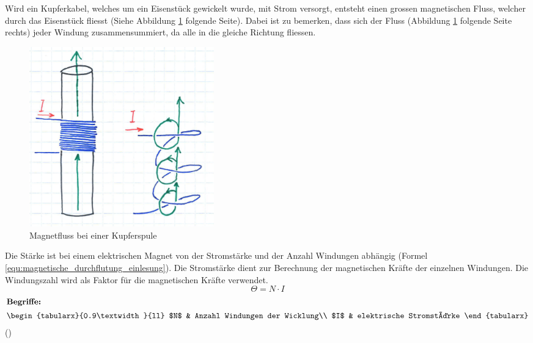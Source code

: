 \newpara
Wird ein Kupferkabel, welches um ein Eisenstück gewickelt wurde, mit Strom versorgt, entsteht einen grossen magnetischen Fluss, welcher durch das Eisenstück fliesst (Siehe Abbildung \ref{fig:kupferspule} folgende Seite). Dabei ist zu bemerken, dass sich der Fluss (Abbildung \ref{fig:kupferspule} folgende Seite rechts) jeder Windung zusammensummiert, da alle in die gleiche Richtung fliessen.
\begin{figure}[ht]
    \begin{center}
      \includegraphics[width=8cm]{assets/images/magnetismus/flussrichtung}
    \end{center}
    \vspace{-3ex}
    \caption{Magnetfluss bei einer Kupferspule}
    \label{fig:kupferspule}
\end{figure}
\newpara
Die Stärke ist bei einem elektrischen Magnet von der Stromstärke und der Anzahl Windungen abhängig (Formel \ref{equ:magnetische_durchflutung_einlesung}). Die Stromstärke dient zur Berechnung der magnetischen Kräfte der einzelnen Windungen. Die Windungszahl wird als Faktor für die magnetischen Kräfte verwendet.
\newpage
\begin{equation}
\label{equ:magnetische_durchflutung_einlesung}
\Theta = N\cdot I
\end{equation}
\begin{gather}
\shortintertext{\textbf{Begriffe:}}
\begin{tabularx}{0.9\textwidth}{ll}
$N$	 &  Anzahl Windungen der Wicklung\\
$I$	 &  elektrische Stromstärke
\end{tabularx}\nonumber
\end{gather}
(\cite[S.452]{kuchling2014taschenbuch})
